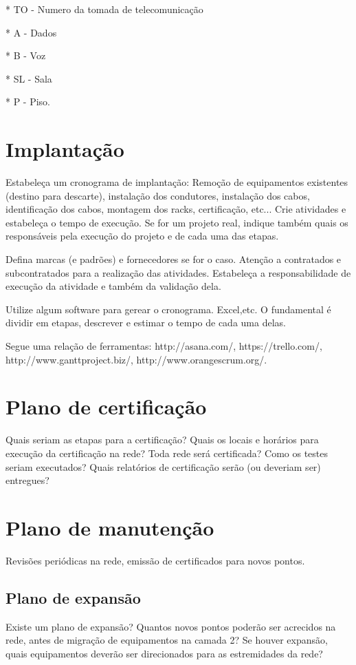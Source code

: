 \documentclass[	DIV=calc,%
							paper=a4,%
							fontsize=12pt,%
							onecolumn]{scrartcl}	 					%
\begin{document}
*  TO -  Numero da tomada de telecomunicação 

*  A -   Dados

*  B -   Voz

*  SL -  Sala

*  P -   Piso.

\section{Implantação}
Estabeleça um cronograma de implantação:
Remoção de equipamentos existentes (destino para descarte), instalação dos condutores, instalação dos cabos, 
identificação dos cabos, montagem dos racks, certificação, etc... Crie atividades e estabeleça o tempo de execução. Se for um projeto real, indique também quais os responsáveis pela execução do projeto e de cada uma das etapas.

Defina marcas (e padrões) e fornecedores se for o caso. Atenção a contratados e subcontratados para a realização das atividades. Estabeleça a responsabilidade de execução da atividade e também da validação dela.

Utilize algum software para gerear o cronograma. Excel,etc. O fundamental é dividir em etapas, descrever e estimar o tempo de cada uma delas.

Segue uma relação de ferramentas:
http://asana.com/, 
https://trello.com/, 
http://www.ganttproject.biz/, 
http://www.orangescrum.org/. 

\section{Plano de certificação}
Quais seriam as etapas para a certificação? 
Quais os locais e horários para execução da certificação na rede? Toda rede será certificada?
Como os testes seriam executados?
Quais relatórios de certificação serão (ou deveriam ser) entregues? 

\section{Plano de manutenção}

Revisões periódicas na rede, emissão de certificados para novos pontos.

\subsection{Plano de expansão}
Existe um plano de expansão? Quantos novos pontos poderão ser acrecidos na rede, antes de migração de equipamentos na camada 2? Se houver expansão, quais equipamentos deverão ser direcionados para as estremidades da rede? 
\end{document}
